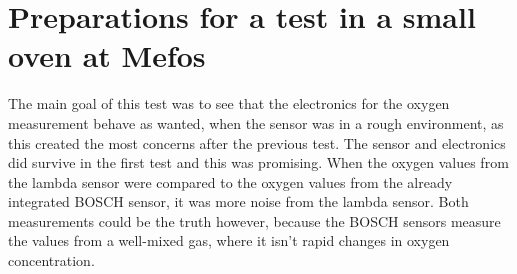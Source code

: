 







\section{Preparations for a test in a small oven at Mefos}

The main goal of this test was to see that the electronics for the oxygen measurement behave as wanted, when the sensor was in a rough environment, as this created the most concerns after the previous test. The sensor and electronics did survive in the first test and this was promising. When the oxygen values from the lambda sensor were compared to the oxygen values from the already integrated BOSCH sensor, it was more noise from the lambda sensor. Both measurements could be the truth however, because the BOSCH sensors measure the values from a well-mixed gas, where it isn't rapid changes in oxygen concentration.

